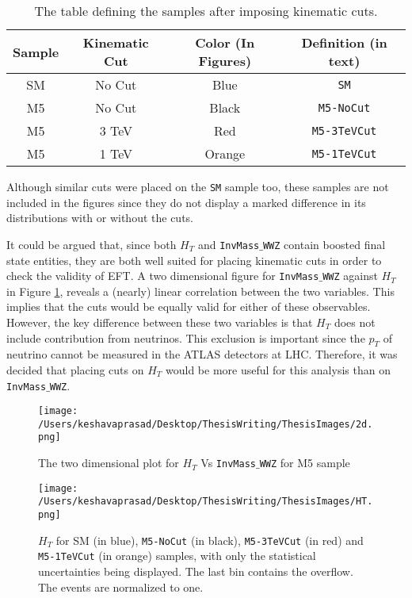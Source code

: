  \begin{table}
 	\centering

 	\begin{tabular}{|c|c|c|c|}
 		\hline
 		Sample & Kinematic Cut & Color (In Figures) & Definition (in text)\\
 		\hline \hline
 		SM & No Cut & Blue & \texttt{SM}\\
 		\hline
 		M5 & No Cut & Black & \texttt{M5-NoCut} \\
 		\hline
 		M5 & 3 TeV & Red & \texttt{M5-3TeVCut}\\
 		\hline
 		M5 & 1 TeV & Orange & \texttt{M5-1TeVCut} \\
 		\hline

 	\end{tabular}

 	\caption{The table defining the samples after imposing kinematic cuts.}
 	\label{table4}
 \end{table}
 Although similar cuts were placed on the \texttt{SM} sample too, these samples are not included in the figures since they do not display a marked difference in its distributions with or without the cuts.

It could be argued that, since both $H_{T}$ and \texttt{InvMass$\_$WWZ} contain boosted final state entities, they are both well suited for placing kinematic cuts in order to check the validity of EFT. A two dimensional figure for \texttt{InvMass$\_$WWZ} against $H_{T}$ in Figure \ref{2D}, reveals a (nearly) linear correlation between the two variables. This implies that the cuts would be equally valid for either of these observables. However, the key difference between these two variables is that $H_{T}$ does not include contribution from neutrinos. This exclusion is important since the $p_{T}$ of neutrino cannot be measured in the ATLAS detectors \cite{ATLASDetector} at LHC. Therefore, it was decided that placing cuts on $H_{T}$ would be more useful for this analysis than on \texttt{InvMass$\_$WWZ}.
\begin{figure}[!htb]
	\centering
	\texttt{[image: /Users/keshavaprasad/Desktop/ThesisWriting/ThesisImages/2d.png]}
	\caption{The two dimensional plot for $H_{T}$ Vs \texttt{InvMass$\_$WWZ} for M5 sample}
	\label{2D}
\end{figure}
\begin{figure}[!htb]
	\centering
	\texttt{[image: /Users/keshavaprasad/Desktop/ThesisWriting/ThesisImages/HT.png]}
	\caption{$H_{T}$ for SM (in blue), \texttt{M5-NoCut} (in black), \texttt{M5-3TeVCut} (in red) and \texttt{M5-1TeVCut} (in orange) samples, with only the statistical uncertainties being displayed. The last bin contains the overflow. The events are normalized to one.}
	\label{HT}
\end{figure}

